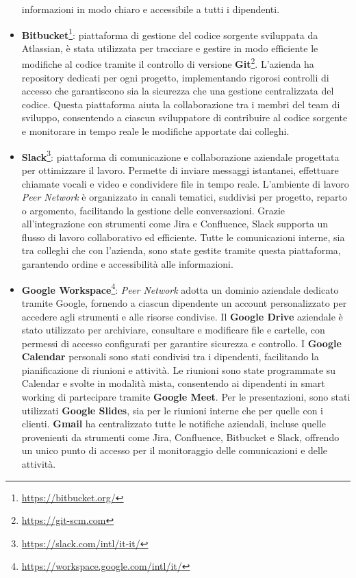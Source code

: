 \begin{itemize}
    informazioni in modo chiaro e accessibile a tutti i dipendenti.
    \item \textbf{Bitbucket}\footnote{\url{https://bitbucket.org/}}: piattaforma di gestione del codice sorgente sviluppata da Atlassian, è stata utilizzata per tracciare e gestire in modo efficiente le
    modifiche al codice tramite il controllo di versione \textbf{Git}\footnote{\url{https://git-scm.com}}. L'azienda ha repository dedicati per ogni progetto, implementando rigorosi controlli di accesso che
    garantiscono sia la sicurezza che una gestione centralizzata del codice. Questa piattaforma aiuta la collaborazione tra i membri del team di sviluppo, consentendo
    a ciascun sviluppatore di contribuire al codice sorgente e monitorare in tempo reale le modifiche apportate dai colleghi.
    \item \textbf{Slack}\footnote{\url{https://slack.com/intl/it-it/}}: piattaforma di comunicazione e collaborazione aziendale progettata per ottimizzare il lavoro. Permette di inviare messaggi istantanei, effettuare
    chiamate vocali e video e condividere file in tempo reale. L’ambiente di lavoro \textit{Peer Network} è organizzato in canali tematici, suddivisi per progetto, reparto o argomento,
    facilitando la gestione delle conversazioni. Grazie all’integrazione con strumenti come Jira e Confluence, Slack supporta un flusso di lavoro collaborativo ed efficiente.
    Tutte le comunicazioni interne, sia tra colleghi che con l’azienda, sono state gestite tramite questa piattaforma, garantendo ordine e accessibilità alle informazioni.
    \item \textbf{Google Workspace}\footnote{\url{https://workspace.google.com/intl/it/}}: \textit{Peer Network} adotta un dominio aziendale dedicato tramite Google, fornendo a ciascun dipendente un account personalizzato
    per accedere agli strumenti e alle risorse condivise. Il \textbf{Google Drive} aziendale è stato utilizzato per archiviare, consultare e modificare file e cartelle, con permessi
    di accesso configurati per garantire sicurezza e controllo. I \textbf{Google Calendar} personali sono stati condivisi tra i dipendenti, facilitando la pianificazione di riunioni
    e attività. Le riunioni sono state programmate su Calendar e svolte in modalità mista, consentendo ai dipendenti in smart working di partecipare tramite \textbf{Google Meet}.
    Per le presentazioni, sono stati utilizzati \textbf{Google Slides}, sia per le riunioni interne che per quelle con i clienti. \textbf{Gmail} ha centralizzato tutte le notifiche aziendali,
    incluse quelle provenienti da strumenti come Jira, Confluence, Bitbucket e Slack, offrendo un unico punto di accesso per il monitoraggio delle comunicazioni e delle attività.

\end{itemize}
